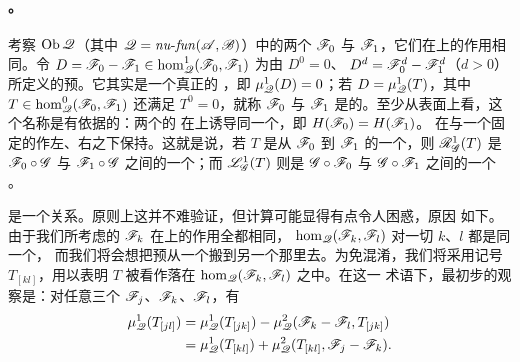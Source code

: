 \paragraph{\trHomotopy。}\label{sub:homotopy}
考察 $\operatorname{Ob}\mathscr{Q}$（其中 $\mathscr{Q}=\mathit{nu}\text{-}\mathit{fun}(\mathscr{A},\mathscr{B})$）中的两个%
\trNonunital{}\trAFunctor{} $\mathscr{F}_0$ 与 $\mathscr{F}_1$，它们在\trObject{}上的作用相同。令
$D=\mathscr{F}_0-\mathscr{F}_1\in\hom^1_{\mathscr{Q}}(\mathscr{F}_0,\mathscr{F}_1)$ 为由 $D^0=0$、
$D^d=\mathscr{F}_0^d-\mathscr{F}_1^d$（$d>0$）所定义的预\trNaturalTransformation。它其实是一个真正的%
\trNaturalTransformation，即 $\mu^1_{\mathscr{Q}}(D)=0$；若 $D=\mu^1_{\mathscr{Q}}(T)$，其中
$T\in\hom^0_{\mathscr{Q}}(\mathscr{F}_0,\mathscr{F}_1)$ 还满足 $T^0=0$，就称 $\mathscr{F}_0$ 与
$\mathscr{F}_1$ 是\trHomotopic{}的。至少从表面上看，这个名称是有依据的：两个\trHomotopic{}的%
\trFunctor{}在\trCohomology{}上诱导同一个\trFunctor，即 $H(\mathscr{F}_0)=H(\mathscr{F}_1)$。
\trHomotopy{}在与一个固定的\trFunctor{}作左、右\trComposition{}之下保持。这就是说，若 $T$ 是从
$\mathscr{F}_0$ 到 $\mathscr{F}_1$ 的一个\trHomotopy，则 $\mathscr{R}^1_{\mathscr{G}}(T)$ 是
$\mathscr{F}_0\circ\mathscr{G}$ 与 $\mathscr{F}_1\circ\mathscr{G}$ 之间的一个\trHomotopy；而
$\mathscr{L}^1_{\mathscr{G}}(T)$ 则是 $\mathscr{G}\circ\mathscr{F}_0$ 与 $\mathscr{G}\circ\mathscr{F}_1$ 之间的一个%
\trHomotopy。

\trHomotopy{}是一个\trEquivalence{}关系。原则上这并不难验证，但计算可能显得有点令人困惑，原因
如下。由于我们所考虑的\trFunctor{} $\mathscr{F}_k$ 在\trObject{}上的作用全都相同，\trGraded%
\trVectorSpace{} $\hom_{\mathscr{Q}}(\mathscr{F}_k,\mathscr{F}_l)$ 对一切 $k$、$l$ 都是同一个，
而我们将会想把预\trNaturalTransformation{}从一个搬到另一个那里去。为免混淆，我们将采用记号
$T_{[kl]}$，用以表明 $T$ 被看作落在 $\hom_{\mathscr{Q}}(\mathscr{F}_k,\mathscr{F}_l)$ 之中。在这一
术语下，最初步的观察是：对任意三个\trFunctor{} $\mathscr{F}_j$、$\mathscr{F}_k$、$\mathscr{F}_l$，有
\begin{equation}\label{eq:homotopy-basic-observation}
\begin{split}
\mu^1_{\mathscr{Q}}(T_{[jl]})
&=\mu^1_{\mathscr{Q}}(T_{[jk]})-\mu^2_{\mathscr{Q}}(\mathscr{F}_k-\mathscr{F}_l,T_{[jk]})\\
&=\mu^1_{\mathscr{Q}}(T_{[kl]})+\mu^2_{\mathscr{Q}}(T_{[kl]},\mathscr{F}_j-\mathscr{F}_k).
\end{split}
\end{equation}


